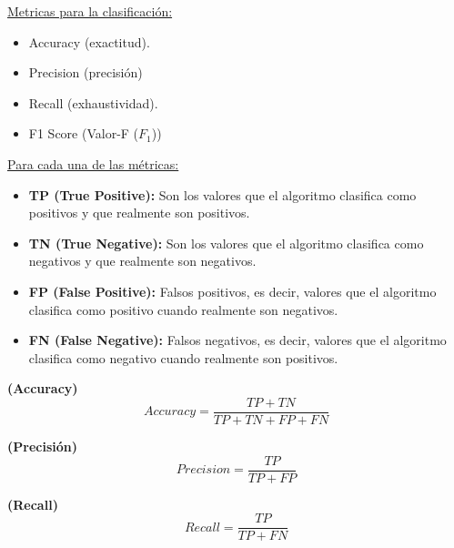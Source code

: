 \documentclass[../main.tex]{subfiles}
\begin{document}
        \underline{Metricas para la clasificación:}
        \begin{itemize}
            \item Accuracy (exactitud).
            \item Precision (precisión)
            \item Recall (exhaustividad).
            \item F1 Score (Valor-F ($F_1$))
        \end{itemize}
        
        \underline{Para cada una de las métricas:}
        \begin{itemize}
            \item \textbf{TP (True Positive):} Son los valores que el algoritmo clasifica como positivos y que realmente son positivos.
            \item \textbf{TN (True Negative):} Son los valores que el algoritmo clasifica como negativos y que realmente son negativos.
            \item \textbf{FP (False Positive):} Falsos positivos, es decir, valores que el algoritmo clasifica como positivo cuando realmente son negativos.
            \item \textbf{FN (False Negative):} Falsos negativos, es decir, valores que el algoritmo clasifica como negativo cuando realmente son positivos.
        \end{itemize}
        
        \begin{definition} \textbf{(Accuracy)}
            \begin{equation}
                Accuracy = \frac{TP + TN}{TP + TN + FP + FN}
            \end{equation}
        \end{definition}

        \begin{definition} \textbf{(Precisión)}
            \begin{equation}
                Precision = \frac{TP}{TP + FP}
            \end{equation}
        \end{definition}
        
        \begin{definition} \textbf{(Recall)}
            \begin{equation}
                Recall = \frac{TP}{TP + FN}
            \end{equation}
        \end{definition}
        
\end{document}
